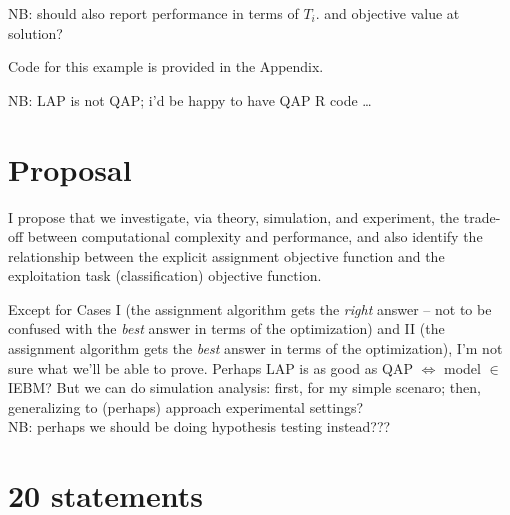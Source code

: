 NB:
should also report performance in terms of $T_i$.
and objective value at solution?

Code for this example is provided in the Appendix.

NB: LAP is not QAP; i'd be happy to have QAP R code \dots

\section{Proposal}

I propose that we investigate,
via theory, simulation, and experiment,
the trade-off between computational complexity and performance,
and also identify the relationship between
the explicit assignment objective function
and the exploitation task (classification) objective function.

Except for Cases
I
(the assignment algorithm gets the {\em right} answer --
not to be confused with the {\em best} answer in terms of the optimization)
and
II
(the assignment algorithm gets the {\em best} answer in terms of the optimization),
I'm not sure what we'll be able to prove.
Perhaps
\thma
LAP is as good as QAP $\iff$ model $\in$ IEBM?
\thmb
But we can do simulation analysis:
first, for my simple scenaro;
then, generalizing to (perhaps) approach experimental settings?
\\

NB: perhaps we should be doing hypothesis testing instead???


\section{20 statements}

